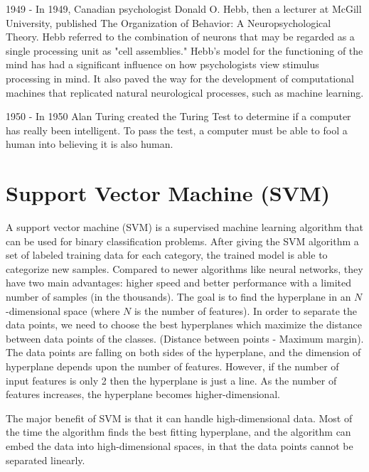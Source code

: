 \documentclass[english,12pt,oneside,a4paper]{article}
\begin{document}
		1949 - In 1949, Canadian psychologist Donald O. Hebb, then a lecturer at McGill University, published The Organization of Behavior: A Neuropsychological Theory. Hebb referred to the combination of neurons that may be regarded as a single processing unit as "cell assemblies."
		Hebb's model for the functioning of the mind has had a significant influence on how psychologists view stimulus processing in mind. It also paved the way for the development of computational machines that replicated natural neurological processes, such as machine learning.
		
		1950 - In 1950 Alan Turing created the Turing Test to determine if a computer has really been intelligent. To pass the test, a computer must be able to fool a human into believing it is also human.
		\section{Support Vector Machine (SVM)}
		A support vector machine (SVM) is a supervised machine learning algorithm that can be used for binary classification problems. After giving the SVM algorithm a set of labeled training data for each category, the trained model is able to categorize new samples. Compared to newer algorithms like neural networks, they have two main advantages: higher speed and better performance with a limited number of samples (in the thousands).
		The goal is to find the hyperplane in an $N$-dimensional space (where $N$ is the number of features). In order to separate the data points, we need to choose the best hyperplanes which maximize the distance between data points of the classes. (Distance between points - Maximum margin). The data points are falling on both sides of the hyperplane, and the dimension of hyperplane depends upon the number of features. However, if the number of input features is only 2 then the hyperplane is just a line. As the number of features increases, the hyperplane becomes higher-dimensional.
		
		The major benefit of SVM is that it can handle high-dimensional data. Most of the time the algorithm finds the best fitting hyperplane, and the algorithm can embed the data into high-dimensional spaces, in that the data points cannot be separated linearly. 
		
\end{document}
